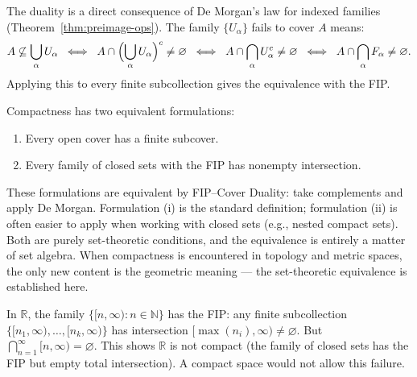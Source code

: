 \begin{remark*}
The duality is a direct consequence of De Morgan's law for indexed families
(Theorem~\ref{thm:preimage-ops}). The family $\{U_\alpha\}$ fails to cover
$A$ means:
\[
A \not\subseteq \bigcup_\alpha U_\alpha
\;\;\Longleftrightarrow\;\;
A \cap \Bigl(\bigcup_\alpha U_\alpha\Bigr)^c \neq \varnothing
\;\;\Longleftrightarrow\;\;
A \cap \bigcap_\alpha U_\alpha^c \neq \varnothing
\;\;\Longleftrightarrow\;\;
A \cap \bigcap_\alpha F_\alpha \neq \varnothing.
\]
Applying this to every finite subcollection gives the equivalence with the FIP.
\end{remark*}

\begin{remark*}
Compactness has two equivalent formulations:
\begin{enumerate}[label=(\roman*)]
\item Every open cover has a finite subcover.
\item Every family of closed sets with the FIP has nonempty intersection.
\end{enumerate}
These formulations are equivalent by FIP--Cover Duality: take complements and
apply De Morgan. Formulation (i) is the standard definition; formulation (ii)
is often easier to apply when working with closed sets (e.g., nested compact
sets). Both are purely set-theoretic conditions, and the equivalence is
entirely a matter of set algebra. When compactness is encountered in topology
and metric spaces, the only new content is the geometric meaning --- the
set-theoretic equivalence is established here.
\end{remark*}

\begin{example*}
In $\mathbb{R}$, the family $\{[n, \infty) : n \in \mathbb{N}\}$ has the FIP:
any finite subcollection $\{[n_1,\infty), \dots, [n_k,\infty)\}$ has
intersection $[\max(n_i), \infty) \neq \varnothing$. But
$\bigcap_{n=1}^\infty [n, \infty) = \varnothing$. This shows $\mathbb{R}$ is
not compact (the family of closed sets has the FIP but empty total
intersection). A compact space would not allow this failure.
\end{example*}
